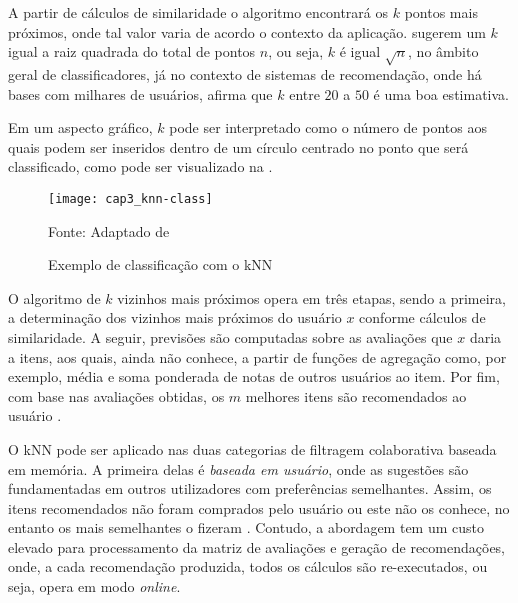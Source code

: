             A partir de cálculos de similaridade o algoritmo encontrará os $k$ pontos mais próximos, onde tal valor varia de acordo o contexto da aplicação.  sugerem um $k$  igual a raiz quadrada do total de pontos $n$, ou seja, $k$ é igual $\sqrt{n}$, no âmbito geral de classificadores, já no contexto de sistemas de recomendação, onde há bases com milhares de usuários,  afirma que $k$ entre $20$ a $50$ é uma boa estimativa. 
            
            Em um aspecto gráfico, $k$ pode ser interpretado como o número de pontos aos quais podem ser inseridos dentro de um círculo centrado no ponto que será classificado, como pode ser visualizado na . 
            
            \begin{figure}[htb]
                \caption{Exemplo de classificação com o kNN}
                \texttt{[image: cap3\_knn-class]}
                \label{fig:cap3_knn-class}
                
                {\footnotesize Fonte: Adaptado de }
            \end{figure}            
            
                 
            O algoritmo de $k$ vizinhos mais próximos opera em três etapas, sendo a primeira, a determinação dos vizinhos mais próximos do usuário $x$ conforme cálculos de similaridade. A seguir, previsões são computadas sobre as avaliações que $x$ daria a itens, aos quais, ainda não conhece, a partir de funções de agregação como, por exemplo, média e soma ponderada de notas de outros usuários ao item. Por fim, com base nas avaliações obtidas, os $m$ melhores itens são recomendados ao usuário \cite{Bobadilla_2013}.
            
            
            O kNN pode ser aplicado nas duas categorias de filtragem colaborativa baseada em memória. A primeira delas é \textit{baseada em usuário}, onde as sugestões são fundamentadas em outros utilizadores com preferências semelhantes. Assim, os itens recomendados não foram comprados pelo usuário ou este não os conhece, no entanto os mais semelhantes o fizeram \cite{Ricci2010}. Contudo, a abordagem tem um custo elevado para processamento da matriz de avaliações e geração de recomendações, onde, a cada recomendação produzida, todos os cálculos são re-executados, ou seja, opera em modo \textit{online}.
            

